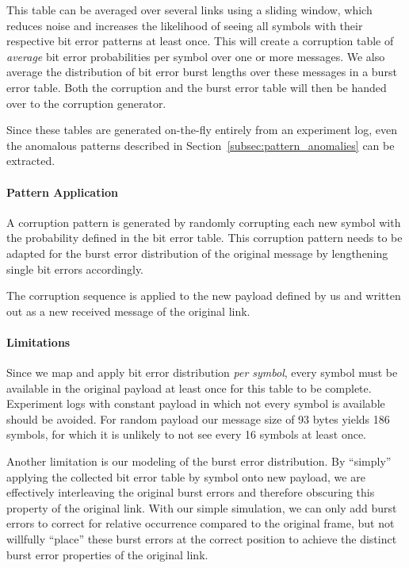 This table can be averaged over several links using a sliding window, which reduces noise and increases the likelihood of seeing all symbols with their respective bit error patterns at least once.
This will create a corruption table of \emph{average} bit error probabilities per symbol over one or more messages.
We also average the distribution of bit error burst lengths over these messages in a burst error table.
Both the corruption and the burst error table will then be handed over to the corruption generator.

Since these tables are generated on-the-fly entirely from an experiment log, even the anomalous patterns described in Section~\ref{subsec:pattern_anomalies} can be extracted.

\paragraph{Pattern Application}

A corruption pattern is generated by randomly corrupting each new symbol with the probability defined in the bit error table.
This corruption pattern needs to be adapted for the burst error distribution of the original message by lengthening single bit errors accordingly.

The corruption sequence is applied to the new payload defined by us and written out as a new received message of the original link.

\paragraph{Limitations}

Since we map and apply bit error distribution \emph{per symbol}, every symbol must be available in the original payload at least once for this table to be complete.
Experiment logs with constant payload in which not every symbol is available should be avoided.
For random payload our message size of 93 bytes yields 186 symbols, for which it is unlikely to not see every 16 symbols at least once.

Another limitation is our modeling of the burst error distribution.
By ``simply'' applying the collected bit error table by symbol onto new payload, we are effectively interleaving the original burst errors and therefore obscuring this property of the original link.
With our simple simulation, we can only add burst errors to correct for relative occurrence compared to the original frame, but not willfully ``place'' these burst errors at the correct position to achieve the distinct burst error properties of the original link.

